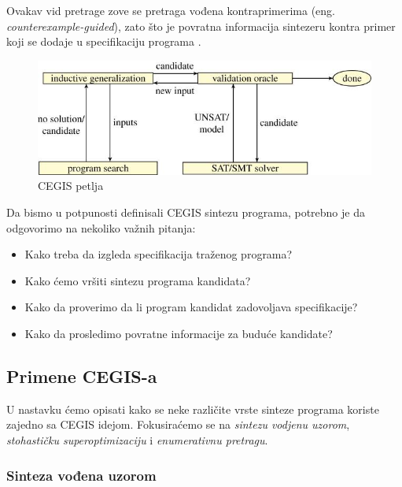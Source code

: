 Ovakav vid pretrage zove se pretraga vođena kontraprimerima (eng. \emph{counterexample-guided}), zato što je povratna informacija sintezeru kontra primer koji se dodaje u specifikaciju programa \cite{PSE}.

\begin{figure}[t]
    \begin{center}
        \includegraphics[scale=0.4]{resources/cegis.jpeg}
    \end{center}
    \caption{CEGIS petlja \cite{AboutPS}}
    \label{fig:cegis}
\end{figure}


Da bismo u potpunosti definisali CEGIS sintezu programa, potrebno je da odgovorimo na nekoliko važnih pitanja:

\begin{itemize}
    \item Kako treba da izgleda specifikacija traženog programa?
    \item Kako ćemo vršiti sintezu programa kandidata?
    \item Kako da proverimo da li program kandidat zadovoljava specifikacije?
    \item Kako da prosledimo povratne informacije za buduće kandidate?
\end{itemize}

\subsection{Primene CEGIS-a}
\label{subsec:PrimeneCEGISa}

U nastavku ćemo opisati kako se neke različite vrste sinteze programa koriste zajedno sa CEGIS idejom. Fokusiraćemo se na \emph{sintezu vodjenu uzorom}, \emph{stohastičku superoptimizaciju} i \emph{enumerativnu pretragu}.


\subsubsection{Sinteza vođena uzorom}
\label{subsec:OracleGuidedSynthesis}


